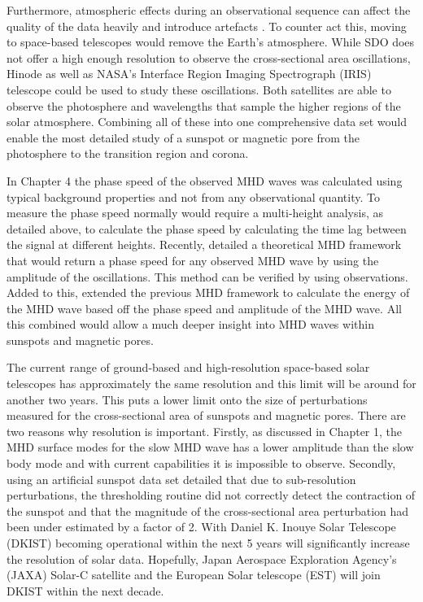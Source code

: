     Furthermore, atmospheric effects during an observational sequence can affect the quality of the data heavily and introduce artefacts \citep{2015A&A...579A..73M}.
    To counter act this, moving to space-based telescopes would remove the Earth's atmosphere.
    While SDO does not offer a high enough resolution to observe the cross-sectional area oscillations, Hinode as well as NASA's Interface Region Imaging Spectrograph (IRIS) telescope could be used to study these oscillations.
    Both satellites are able to observe the photosphere and wavelengths that sample the higher regions of the solar atmosphere. 
    Combining all of these into one comprehensive data set would enable the most detailed study of a sunspot or magnetic pore from the photosphere to the transition region and corona.  
    
    In Chapter 4 the phase speed of the observed MHD waves was calculated using typical background properties and not from any observational quantity.
    To measure the phase speed normally would require a multi-height analysis, as detailed above, to calculate the phase speed by calculating the time lag between the signal at different heights.
    Recently, \cite{2015A&A...579A..73M} detailed a theoretical MHD framework that would return a phase speed for any observed MHD wave by using the amplitude of the oscillations.
    This method can be verified by using observations. 
    Added to this, \cite{2015A&A...578A..60M} extended the previous MHD framework to calculate the energy of the MHD wave based off the phase speed and amplitude of the MHD wave.
    All this combined would allow a much deeper insight into MHD waves within sunspots and magnetic pores.

    The current range of ground-based and high-resolution space-based solar telescopes has approximately the same resolution and this limit will be around for another two years. 
    This puts a lower limit onto the size of perturbations measured for the cross-sectional area of sunspots and magnetic pores.
    There are two reasons why resolution is important.
    Firstly, as discussed in Chapter 1, the MHD surface modes for the slow MHD wave has a lower amplitude than the slow body mode and with current capabilities it is impossible to observe.
    Secondly, \citep{2015A&A...579A..73M} using an artificial sunspot data set detailed that due to sub-resolution perturbations, the thresholding routine did not correctly detect the contraction of the sunspot and that the magnitude of the cross-sectional area perturbation had been under estimated by a factor of 2.
	With Daniel K. Inouye Solar Telescope (DKIST) becoming operational within the next 5 years will significantly increase the resolution of solar data.
	Hopefully, Japan Aerospace Exploration Agency's (JAXA) Solar-C satellite and the European Solar telescope (EST) will join DKIST within the next decade.
	
